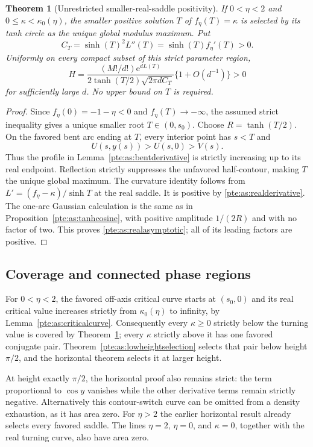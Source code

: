 \documentclass[11pt,a4paper]{article}
\numberwithin{equation}{section}
\newtheorem{theorem}{Theorem}[section]
\theoremstyle{definition}
\theoremstyle{plain}
\newcommand{\ee}{\mathrm e}
\begin{document}
\begin{theorem}[Unrestricted smaller-real-saddle positivity]
\label{pte:as:realpositivity}
If $0<\eta<2$ and $0\le\kappa<\kappa_0(\eta)$, the smaller positive
solution $T$ of $f_\eta(T)=\kappa$ is selected by its tanh circle as the
unique global modulus maximum.  Put
\[
 C_T=\sinh(T)^2L''(T)=\sinh(T)f_\eta'(T)>0.
\]
Uniformly on every compact subset of this strict parameter region,
\begin{equation}\label{pte:as:realasymptotic}
 H=\frac{(M!/d!)\ee^{dL(T)}}
          {2\tanh(T/2)\sqrt{2\pi d C_T}}
          \{1+O(d^{-1})\}>0
\end{equation}
for sufficiently large $d$.  No upper bound on $T$ is required.
\end{theorem}
\begin{proof}
Since $f_\eta(0)=-1-\eta<0$ and $f_\eta(T)\to-\infty$, the assumed
strict inequality gives a unique smaller root $T\in(0,s_0)$.
Choose $R=\tanh(T/2)$.  On the favored bent arc ending at $T$, every
interior point has $s<T$ and
\[
 U(s,y(s))>U(s,0)>V(s).
\]
Thus the profile in Lemma~\ref{pte:as:bentderivative} is strictly increasing
up to its real endpoint.  Reflection strictly suppresses the unfavored
half-contour, making $T$ the unique global maximum.  The curvature
identity follows from $L'=(f_\eta-\kappa)/\sinh T$ at the real saddle.
It is positive by \eqref{pte:as:realderivative}.  The one-arc Gaussian
calculation is the same as in Proposition~\ref{pte:as:tanhcosine}, with
positive amplitude $1/(2R)$ and with no factor of two.  This proves
\eqref{pte:as:realasymptotic}; all of its leading factors are positive.
\end{proof}

\subsection{Coverage and connected phase regions}
\label{pte:as:coverage}
For $0<\eta<2$, the favored off-axis critical curve starts at
$(s_0,0)$ and its real critical value increases strictly from
$\kappa_0(\eta)$ to infinity, by Lemma~\ref{pte:as:criticalcurve}.
Consequently every $\kappa\ge0$ strictly below the turning value is
covered by Theorem~\ref{pte:as:realpositivity}; every $\kappa$ strictly above
it has one favored conjugate pair.  Theorem~\ref{pte:as:lowheightselection}
selects that pair below height $\pi/2$, and the horizontal theorem
selects it at larger height.

At height exactly $\pi/2$, the horizontal proof also remains strict:
the term proportional to $\cos y$ vanishes while the other derivative
terms remain strictly negative.  Alternatively this contour-switch
curve can be omitted from a density exhaustion, as it has area zero.
For $\eta>2$ the earlier horizontal result already selects every favored
saddle.  The lines $\eta=2$, $\eta=0$, and $\kappa=0$, together with the
real turning curve, also have area zero.
\end{document}
